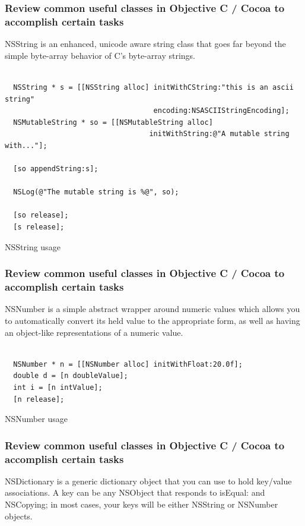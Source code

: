\documentclass[10pt]{beamer}
\begin{document}
\begin{frame}[fragile]
  \frametitle{Review common useful classes in Objective C / Cocoa to accomplish certain tasks}
  NSString is an enhanced, unicode aware string class that goes far beyond the simple byte-array behavior of C's byte-array strings.
\begin{listing}[H]
    \begin{verbatim}

  NSString * s = [[NSString alloc] initWithCString:"this is an ascii string"
                                   encoding:NSASCIIStringEncoding];
  NSMutableString * so = [[NSMutableString alloc]
                                  initWithString:@"A mutable string with..."];

  [so appendString:s];

  NSLog(@"The mutable string is %@", so);

  [so release];
  [s release];

  \end{verbatim}
    \caption{NSString usage}
    \label{listing:20}
  \end{listing}

\end{frame}

\begin{frame}[fragile]
  \frametitle{Review common useful classes in Objective C / Cocoa to accomplish certain tasks}
  NSNumber is a simple abstract wrapper around numeric values which allows you to automatically convert its held value to the appropriate form, as well as having an object-like representations of a numeric value.
\begin{listing}[H]
    \begin{verbatim}

  NSNumber * n = [[NSNumber alloc] initWithFloat:20.0f];
  double d = [n doubleValue];
  int i = [n intValue];
  [n release];

  \end{verbatim}
    \caption{NSNumber usage}
    \label{listing:21}
  \end{listing}

\end{frame}

\begin{frame}[fragile]
  \frametitle{Review common useful classes in Objective C / Cocoa to accomplish certain tasks}
  NSDictionary is a generic dictionary object that you can use to hold key/value associations. A key can be any NSObject that responds to isEqual: and NSCopying; in most cases, your keys will be either NSString or NSNumber objects.

\end{frame}
\end{document}
